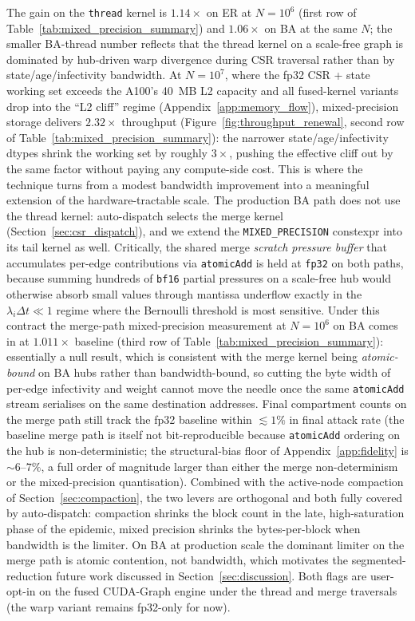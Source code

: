 The gain on the \texttt{thread} kernel is $1.14\times$ on ER at $N=10^6$ (first row of Table~\ref{tab:mixed_precision_summary}) and $1.06\times$ on BA at the same $N$; the smaller BA-thread number reflects that the thread kernel on a scale-free graph is dominated by hub-driven warp divergence during CSR traversal rather than by state/age/infectivity bandwidth. At $N=10^7$, where the fp32 CSR + state working set exceeds the A100's 40~MB L2 capacity and all fused-kernel variants drop into the ``L2 cliff'' regime (Appendix~\ref{app:memory_flow}), mixed-precision storage delivers $\mathbf{2.32\times}$ throughput (Figure~\ref{fig:throughput_renewal}, second row of Table~\ref{tab:mixed_precision_summary}): the narrower state/age/infectivity dtypes shrink the working set by roughly $3\times$, pushing the effective cliff out by the same factor without paying any compute-side cost. This is where the technique turns from a modest bandwidth improvement into a meaningful extension of the hardware-tractable scale. The production BA path does not use the thread kernel: auto-dispatch selects the merge kernel (Section~\ref{sec:csr_dispatch}), and we extend the \texttt{MIXED\_PRECISION} constexpr into its tail kernel as well. Critically, the shared merge \emph{scratch pressure buffer} that accumulates per-edge contributions via \texttt{atomicAdd} is held at \texttt{fp32} on both paths, because summing hundreds of \texttt{bf16} partial pressures on a scale-free hub would otherwise absorb small values through mantissa underflow exactly in the $\lambda_i \Delta t \ll 1$ regime where the Bernoulli threshold is most sensitive. Under this contract the merge-path mixed-precision measurement at $N = 10^6$ on BA comes in at $1.011\times$ baseline (third row of Table~\ref{tab:mixed_precision_summary}): essentially a null result, which is consistent with the merge kernel being \emph{atomic-bound} on BA hubs rather than bandwidth-bound, so cutting the byte width of per-edge infectivity and weight cannot move the needle once the same \texttt{atomicAdd} stream serialises on the same destination addresses. Final compartment counts on the merge path still track the fp32 baseline within $\lesssim\!1\%$ in final attack rate (the baseline merge path is itself not bit-reproducible because \texttt{atomicAdd} ordering on the hub is non-deterministic; the structural-bias floor of Appendix~\ref{app:fidelity} is $\sim\!6$--$7\%$, a full order of magnitude larger than either the merge non-determinism or the mixed-precision quantisation). Combined with the active-node compaction of Section~\ref{sec:compaction}, the two levers are orthogonal and both fully covered by auto-dispatch: compaction shrinks the block count in the late, high-saturation phase of the epidemic, mixed precision shrinks the bytes-per-block when bandwidth is the limiter. On BA at production scale the dominant limiter on the merge path is atomic contention, not bandwidth, which motivates the segmented-reduction future work discussed in Section~\ref{sec:discussion}. Both flags are user-opt-in on the fused CUDA-Graph engine under the thread and merge traversals (the warp variant remains fp32-only for now).


